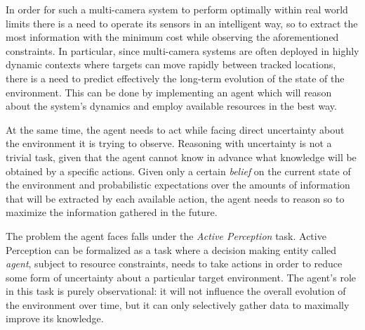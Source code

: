 
In order for such a multi-camera system to perform optimally within real world limits there is a
need to operate its sensors in an intelligent way, so to extract the most information with the
minimum cost while observing the aforementioned constraints. In particular, since multi-camera
systems are often deployed in highly dynamic contexts where targets can move rapidly between tracked
locations, there is a need to predict effectively the long-term evolution of the state of the
environment. This can be done by implementing an agent which will reason about the system's
dynamics and employ available resources in the best way.

At the same time, the agent needs to act while facing direct uncertainty about the environment it is
trying to observe. Reasoning with uncertainty is not a trivial task, given that the agent cannot
know in advance what knowledge will be obtained by a specific actions. Given only a certain
\textit{belief} on the current state of the environment and probabilistic expectations over the
amounts of information that will be extracted by each available action, the agent needs to reason so
to maximize the information gathered in the future.


The problem the agent faces falls under the \textit{Active Perception} \cite{cit:relworkspaan}
\cite{cit:relworkspaancoop} \cite{cit:relworksatsangi} task.  Active Perception can be formalized as
a task where a decision making entity called \textit{agent}, subject to resource constraints, needs
to take actions in order to reduce some form of uncertainty about a particular target environment.
The agent's role in this task is purely observational: it will not influence the overall evolution
of the environment over time, but it can only selectively gather data to maximally improve its
knowledge.

